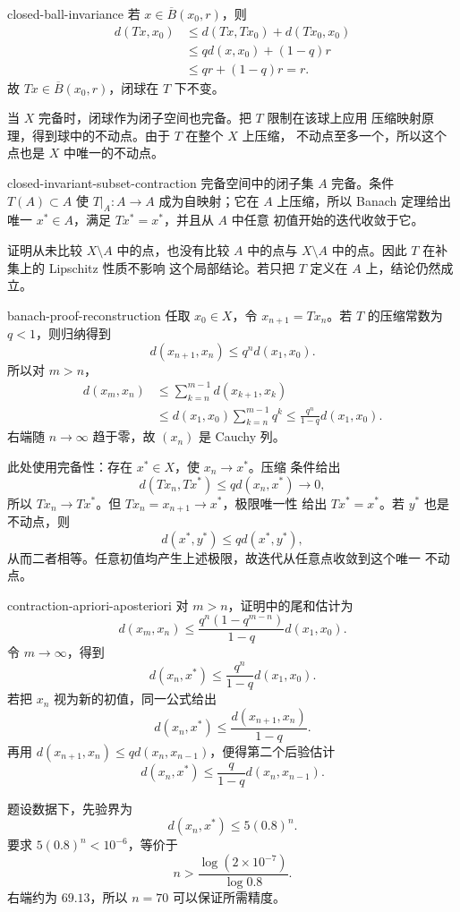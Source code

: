 \begin{solution}{closed-ball-invariance}
若 \(x\in\overline B(x_0,r)\)，则
\[
\begin{aligned}
 d(Tx,x_0)
 &\le d(Tx,Tx_0)+d(Tx_0,x_0)\\
 &\le qd(x,x_0)+(1-q)r\\
 &\le qr+(1-q)r=r.
\end{aligned}
\]
故 \(Tx\in\overline B(x_0,r)\)，闭球在 \(T\) 下不变。

当 \(X\) 完备时，闭球作为闭子空间也完备。把 \(T\) 限制在该球上应用
压缩映射原理，得到球中的不动点。由于 \(T\) 在整个 \(X\) 上压缩，
不动点至多一个，所以这个点也是 \(X\) 中唯一的不动点。
\end{solution}

\begin{solution}{closed-invariant-subset-contraction}
完备空间中的闭子集 \(A\) 完备。条件 \(T(A)\subset A\) 使
\(T|_A:A\to A\) 成为自映射；它在 \(A\) 上压缩，所以 Banach 定理给出
唯一 \(x^\ast\in A\)，满足 \(Tx^\ast=x^\ast\)，并且从 \(A\) 中任意
初值开始的迭代收敛于它。

证明从未比较 \(X\setminus A\) 中的点，也没有比较 \(A\) 中的点与
\(X\setminus A\) 中的点。因此 \(T\) 在补集上的 Lipschitz 性质不影响
这个局部结论。若只把 \(T\) 定义在 \(A\) 上，结论仍然成立。
\end{solution}

\begin{solution}{banach-proof-reconstruction}
任取 \(x_0\in X\)，令 \(x_{n+1}=Tx_n\)。若 \(T\) 的压缩常数为
\(q<1\)，则归纳得到
\[
 d(x_{n+1},x_n)\le q^n d(x_1,x_0).
\]
所以对 \(m>n\)，
\[
\begin{aligned}
 d(x_m,x_n)
 &\le\sum_{k=n}^{m-1}d(x_{k+1},x_k)\\
 &\le d(x_1,x_0)\sum_{k=n}^{m-1}q^k
 \le\frac{q^n}{1-q}d(x_1,x_0).
\end{aligned}
\]
右端随 \(n\to\infty\) 趋于零，故 \((x_n)\) 是 Cauchy 列。

此处使用完备性：存在 \(x^\ast\in X\)，使 \(x_n\to x^\ast\)。压缩
条件给出
\[
 d(Tx_n,Tx^\ast)\le qd(x_n,x^\ast)\to0,
\]
所以 \(Tx_n\to Tx^\ast\)。但 \(Tx_n=x_{n+1}\to x^\ast\)，极限唯一性
给出 \(Tx^\ast=x^\ast\)。若 \(y^\ast\) 也是不动点，则
\[
 d(x^\ast,y^\ast)\le qd(x^\ast,y^\ast),
\]
从而二者相等。任意初值均产生上述极限，故迭代从任意点收敛到这个唯一
不动点。
\end{solution}

\begin{solution}{contraction-apriori-aposteriori}
对 \(m>n\)，证明中的尾和估计为
\[
 d(x_m,x_n)\le
 \frac{q^n(1-q^{m-n})}{1-q}d(x_1,x_0).
\]
令 \(m\to\infty\)，得到
\[
 d(x_n,x^\ast)\le
 \frac{q^n}{1-q}d(x_1,x_0).
\]
若把 \(x_n\) 视为新的初值，同一公式给出
\[
 d(x_n,x^\ast)\le\frac{d(x_{n+1},x_n)}{1-q}.
\]
再用
\(d(x_{n+1},x_n)\le qd(x_n,x_{n-1})\)，便得第二个后验估计
\[
 d(x_n,x^\ast)\le
 \frac{q}{1-q}d(x_n,x_{n-1}).
\]

题设数据下，先验界为
\[
 d(x_n,x^\ast)\le5(0.8)^n.
\]
要求 \(5(0.8)^n<10^{-6}\)，等价于
\[
 n>\frac{\log(2\times10^{-7})}{\log0.8}.
\]
右端约为 \(69.13\)，所以 \(n=70\) 可以保证所需精度。
\end{solution}

